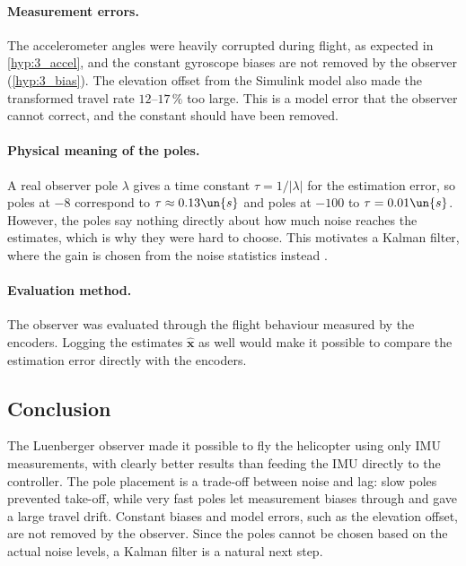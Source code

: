 \paragraph{Measurement errors.}
The accelerometer angles were heavily corrupted during flight, as expected in \ref{hyp:3_accel}, and the constant gyroscope biases are not removed by the observer (\ref{hyp:3_bias}).
The elevation offset from the Simulink model also made the transformed travel rate \(12\)--\(17\,\%\) too large.
This is a model error that the observer cannot correct, and the constant should have been removed.

\paragraph{Physical meaning of the poles.}
A real observer pole \(\lambda\) gives a time constant \(\tau = 1/|\lambda|\) for the estimation error, so poles at \(-8\) correspond to \(\tau \approx 0.13\un{s}\) and poles at \(-100\) to \(\tau = 0.01\un{s}\).
However, the poles say nothing directly about how much noise reaches the estimates, which is why they were hard to choose.
This motivates a Kalman filter, where the gain is chosen from the noise statistics instead \cite{brown_kalman}.

\paragraph{Evaluation method.}
The observer was evaluated through the flight behaviour measured by the encoders.
Logging the estimates \(\hat{\mathbf{x}}\) as well would make it possible to compare the estimation error directly with the encoders.

\subsection{Conclusion}

The Luenberger observer made it possible to fly the helicopter using only IMU measurements, with clearly better results than feeding the IMU directly to the controller.
The pole placement is a trade-off between noise and lag: slow poles prevented take-off, while very fast poles let measurement biases through and gave a large travel drift.
Constant biases and model errors, such as the elevation offset, are not removed by the observer.
Since the poles cannot be chosen based on the actual noise levels, a Kalman filter is a natural next step.
